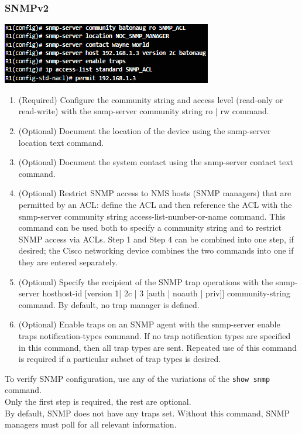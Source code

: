 \subsubsection{SNMPv2}
\begin{listing}
\includegraphics[scale=1]{pictures/SNMPv2.PNG} 
\end{listing}
\begin{enumerate}
\item (Required) Configure the community string and access level (read-only or read-write) with the snmp-server community string ro | rw command.

\item (Optional) Document the location of the device using the snmp-server location text command.

\item (Optional) Document the system contact using the snmp-server contact text command.

\item (Optional) Restrict SNMP access to NMS hosts (SNMP managers) that are permitted by an ACL: define the ACL and then reference the ACL with the snmp-server community string access-list-number-or-name command. This command can be used both to specify a community string and to restrict SNMP access via ACLs. Step 1 and Step 4 can be combined into one step, if desired; the Cisco networking device combines the two commands into one if they are entered separately.

\item (Optional) Specify the recipient of the SNMP trap operations with the snmp-server hosthost-id [version {1| 2c | 3 [auth | noauth | priv]}] community-string command. By default, no trap manager is defined.

\item (Optional) Enable traps on an SNMP agent with the snmp-server enable traps notification-types command. If no trap notification types are specified in this command, then all trap types are sent. Repeated use of this command is required if a particular subset of trap types is desired.
\end{enumerate}
\note To verify SNMP configuration, use any of the variations of the \texttt{show snmp} command.\\ \note Only the first step is required, the rest are optional.\\
\note By default, SNMP does not have any traps set. Without this command, SNMP managers must poll for all relevant information. 
